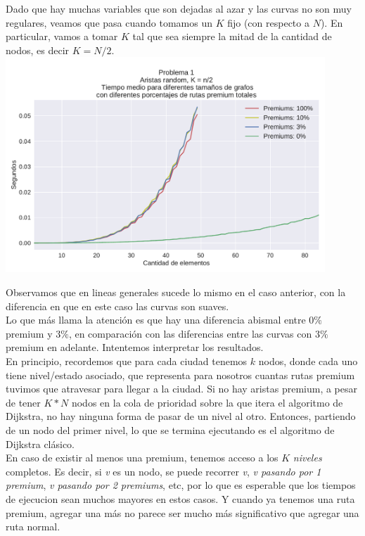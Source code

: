 Dado que hay muchas variables que son dejadas al azar y las curvas no son muy regulares, veamos que pasa cuando tomamos un $K$ fijo (con respecto a $N$). En particular, vamos a tomar $K$ tal que sea siempre la mitad de la cantidad de nodos, es decir $K = N/2$. \\

{\centering
  \includegraphics[width=0.9\textwidth]{imagenes/problema1/kfijo.pdf} \\
}

Observamos que en lineas generales sucede lo mismo en el caso anterior, con la diferencia en que en este caso las curvas son suaves. \\

Lo que más llama la atención es que hay una diferencia abismal entre $0\%$ premium y $3\%$, en comparación con las diferencias entre las curvas con $3\%$ premium en adelante. Intentemos interpretar los resultados. \\

En principio, recordemos que para cada ciudad tenemos $k$ nodos, donde cada uno tiene nivel/estado asociado, que representa para nosotros cuantas rutas premium tuvimos que atravesar para llegar a la ciudad. Si no hay aristas premium, a pesar de tener $K*N$ nodos en la cola de prioridad sobre la que itera el algoritmo de Dijkstra, no hay ninguna forma de pasar de un nivel al otro. Entonces, partiendo de un nodo del primer nivel, lo que se termina ejecutando es el algoritmo de Dijkstra clásico. \\

En caso de existir al menos una premium, tenemos acceso a los $K$ \textit{niveles} completos. Es decir, si \textit{v} es un nodo, se puede recorrer \textit{v}, \textit{v pasando por 1 premium}, \textit{v pasando por 2 premiums}, etc, por lo que es esperable que los tiempos de ejecucion sean muchos mayores en estos casos. Y cuando ya tenemos una ruta premium, agregar una más no parece ser mucho más significativo que agregar una ruta normal. \\

